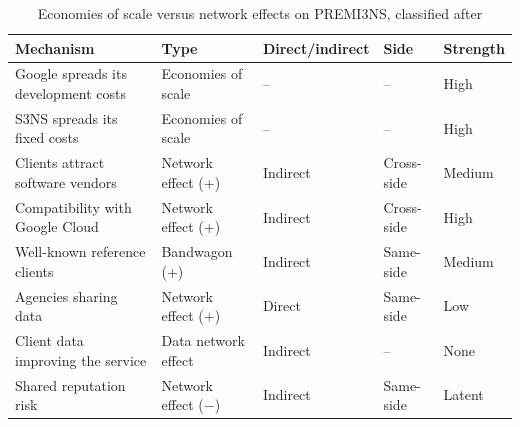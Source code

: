 \begin{table}[ht]
\centering
\small
\caption{Economies of scale versus network effects on PREMI3NS, classified after \textcite[ch.~9]{overby2021}}
\label{tab:task2}
\begin{tabularx}{\linewidth}{Yllll}
\toprule
\textbf{Mechanism} & \textbf{Type} & \textbf{Direct/indirect} & \textbf{Side} & \textbf{Strength} \\
\midrule
Google spreads its development costs & Economies of scale & -- & -- & High \\
S3NS spreads its fixed costs         & Economies of scale & -- & -- & High \\
\addlinespace
Clients attract software vendors     & Network effect (+) & Indirect & Cross-side & Medium \\
Compatibility with Google Cloud      & Network effect (+) & Indirect & Cross-side & High \\
Well-known reference clients         & Bandwagon (+)      & Indirect & Same-side  & Medium \\
Agencies sharing data                & Network effect (+) & Direct   & Same-side  & Low \\
Client data improving the service    & Data network effect & Indirect & --        & None \\
Shared reputation risk               & Network effect ($-$) & Indirect & Same-side & Latent \\
\bottomrule
\end{tabularx}
\end{table}
